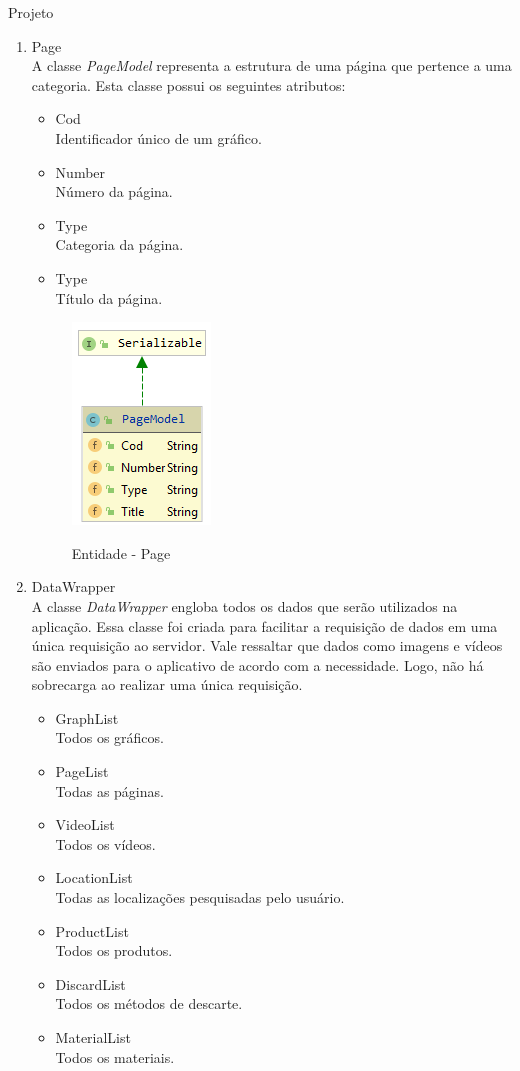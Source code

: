\documentclass[
	12pt,				%
	openany,			%
	twoside,			%
	a4paper,			%
	english,			%
	french,				%
	spanish,			%
	brazil				%
	]{abntex2}
\begin{document}
\begin{chapter}{Projeto}
\begin{enumerate}
  \item{Page}   \\ A classe \textit{PageModel} representa a estrutura de uma página que pertence a uma categoria. Esta classe possui os seguintes atributos:
  \begin{itemize}
  \item{Cod}\\ Identificador único de um gráfico.
       \item{Number}\\Número da página.
         \item{Type}\\ Categoria da página.
          \item{Type}\\ Título da página.
\end{itemize}
\begin{figure}[h]
\centering
   \caption{Entidade - Page}
   \includegraphics[scale=1.0]{media/PageModel.png}
     \label{fig:pageModel}
\end{figure}

\newpage
\item{DataWrapper}   \\ A classe \textit{DataWrapper} engloba todos os dados que serão utilizados na aplicação. Essa classe foi criada para facilitar a requisição de dados em uma única requisição ao servidor. Vale ressaltar que dados como imagens e vídeos são enviados para o aplicativo de acordo com a necessidade. Logo, não há sobrecarga ao realizar uma única requisição.
\newline
  \begin{itemize}
  \item{GraphList}\\ Todos os gráficos.
       \item{PageList}\\  Todas as páginas.
         \item{VideoList}\\ Todos os vídeos.
         \item{LocationList}\\ Todas as localizações pesquisadas pelo usuário.
         \item{ProductList}\\  Todos os produtos.
         \item{DiscardList}\\ Todos os métodos de descarte.
         \item{MaterialList}\\  Todos os materiais.
         

\end{itemize}
\end{enumerate}
\end{chapter}
\end{document}
